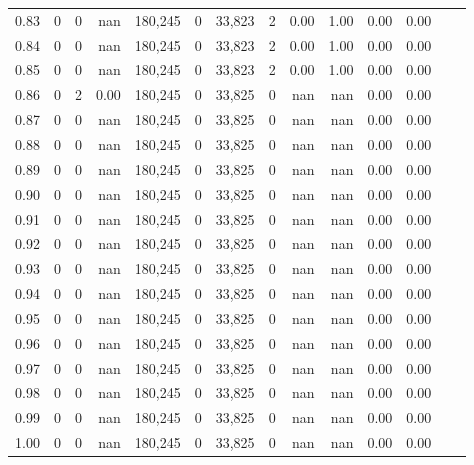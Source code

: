 \begin{tabular}{rrrrrrrrrrrrrr}
0.83 &      0 &      0 &     nan &  180,245 &        0 &  33,823 &       2 &  0.00 &  1.00 &  0.00 &      0.00 \\
0.84 &      0 &      0 &     nan &  180,245 &        0 &  33,823 &       2 &  0.00 &  1.00 &  0.00 &      0.00 \\
0.85 &      0 &      0 &     nan &  180,245 &        0 &  33,823 &       2 &  0.00 &  1.00 &  0.00 &      0.00 \\
0.86 &      0 &      2 &    0.00 &  180,245 &        0 &  33,825 &       0 &   nan &   nan &  0.00 &      0.00 \\
0.87 &      0 &      0 &     nan &  180,245 &        0 &  33,825 &       0 &   nan &   nan &  0.00 &      0.00 \\
0.88 &      0 &      0 &     nan &  180,245 &        0 &  33,825 &       0 &   nan &   nan &  0.00 &      0.00 \\
0.89 &      0 &      0 &     nan &  180,245 &        0 &  33,825 &       0 &   nan &   nan &  0.00 &      0.00 \\
0.90 &      0 &      0 &     nan &  180,245 &        0 &  33,825 &       0 &   nan &   nan &  0.00 &      0.00 \\
0.91 &      0 &      0 &     nan &  180,245 &        0 &  33,825 &       0 &   nan &   nan &  0.00 &      0.00 \\
0.92 &      0 &      0 &     nan &  180,245 &        0 &  33,825 &       0 &   nan &   nan &  0.00 &      0.00 \\
0.93 &      0 &      0 &     nan &  180,245 &        0 &  33,825 &       0 &   nan &   nan &  0.00 &      0.00 \\
0.94 &      0 &      0 &     nan &  180,245 &        0 &  33,825 &       0 &   nan &   nan &  0.00 &      0.00 \\
0.95 &      0 &      0 &     nan &  180,245 &        0 &  33,825 &       0 &   nan &   nan &  0.00 &      0.00 \\
0.96 &      0 &      0 &     nan &  180,245 &        0 &  33,825 &       0 &   nan &   nan &  0.00 &      0.00 \\
0.97 &      0 &      0 &     nan &  180,245 &        0 &  33,825 &       0 &   nan &   nan &  0.00 &      0.00 \\
0.98 &      0 &      0 &     nan &  180,245 &        0 &  33,825 &       0 &   nan &   nan &  0.00 &      0.00 \\
0.99 &      0 &      0 &     nan &  180,245 &        0 &  33,825 &       0 &   nan &   nan &  0.00 &      0.00 \\
1.00 &      0 &      0 &     nan &  180,245 &        0 &  33,825 &       0 &   nan &   nan &  0.00 &      0.00 \\
\bottomrule
\end{tabular}
